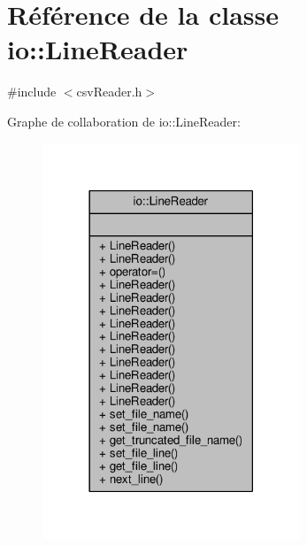 \hypertarget{classio_1_1LineReader}{}\section{Référence de la classe io\+:\+:Line\+Reader}
\label{classio_1_1LineReader}


{\ttfamily \#include $<$csv\+Reader.\+h$>$}



Graphe de collaboration de io\+:\+:Line\+Reader\+:
\nopagebreak
\begin{figure}[H]
\begin{center}
\leavevmode
\includegraphics[width=218pt]{classio_1_1LineReader__coll__graph}
\end{center}
\end{figure}
